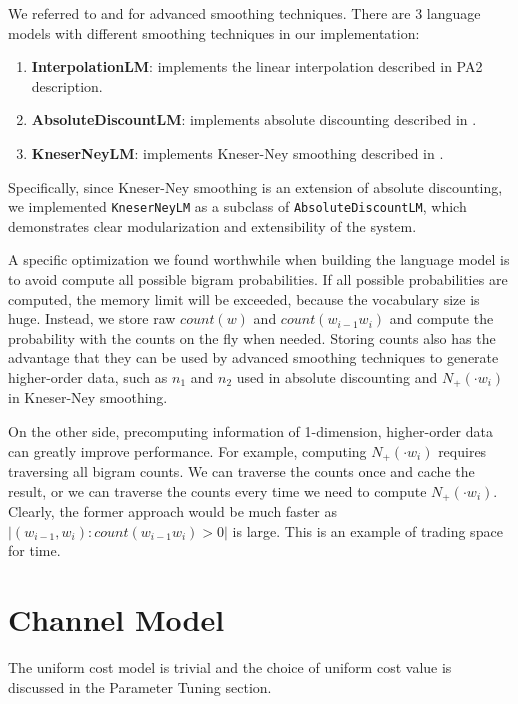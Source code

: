\documentclass{article}
\begin{document}
We referred to \cite{cs124-lm} and \cite{chen-goodman-99} for advanced smoothing techniques. There are 3 language models with different smoothing techniques in our implementation:

\begin{enumerate}
    \item \textbf{InterpolationLM}: implements the linear interpolation described in PA2 description.
    \item \textbf{AbsoluteDiscountLM}: implements absolute discounting described in \cite{chen-goodman-99}.
    \item \textbf{KneserNeyLM}: implements Kneser-Ney smoothing described in \cite{chen-goodman-99}.
\end{enumerate}

Specifically, since Kneser-Ney smoothing is an extension of absolute discounting, we implemented \texttt{KneserNeyLM} as a subclass of \texttt{AbsoluteDiscountLM}, which demonstrates clear modularization and extensibility of the system.

A specific optimization we found worthwhile when building the language model is to avoid compute all possible bigram probabilities. If all possible probabilities are computed, the memory limit will be exceeded, because the vocabulary size is huge. Instead, we store raw $count(w)$ and $count(w_{i-1}w_i)$ and compute the probability with the counts on the fly when needed. Storing counts also has the advantage that they can be used by advanced smoothing techniques to generate higher-order data, such as $n_1$ and $n_2$ used in absolute discounting and $N_{+}({\cdot}w_i)$ in Kneser-Ney smoothing.

On the other side, precomputing information of 1-dimension, higher-order data can greatly improve performance. For example, computing $N_{+}({\cdot}w_i)$ requires traversing all bigram counts. We can traverse the counts once and cache the result, or we can traverse the counts every time we need to compute $N_{+}({\cdot}w_i)$. Clearly, the former approach would be much faster as $|(w_{i-1},w_i): count(w_{i-1}w_i)>0|$ is large. This is an example of trading space for time.

\section{Channel Model}

The uniform cost model is trivial and the choice of uniform cost value is discussed in the Parameter Tuning section.
\end{document}
